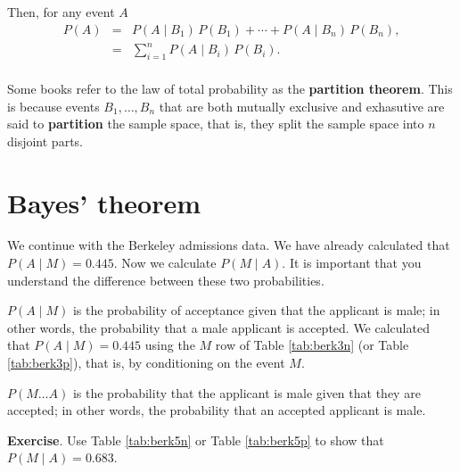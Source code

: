 \documentclass[
  11pt,
  british,
  openany, a4paper]{book}
\begin{document}
Then, for any event \(A\)
\begin{eqnarray}
P(A) &=& P(A \mid B_1)\,P(B_1) + \cdots + P(A \mid B_n)\,P(B_n), \\
     &=& \displaystyle\sum_{i=1}^n P(A \mid B_i)\,P(B_i). \\
\end{eqnarray}

Some books refer to the law of total probability as the \textbf{partition theorem}. This is because events \(B_1, \ldots, B_n\) that are both mutually exclusive and exhasutive are said to \textbf{partition} the sample space, that is, they split the sample space into \(n\) disjoint parts.

\hypertarget{bayes-theorem}{%
\section{Bayes' theorem}\label{bayes-theorem}}

We continue with the Berkeley admissions data. We have already calculated that \(P(A \mid M) = 0.445\). Now we calculate \(P(M \mid A)\). It is important that you understand the difference between these two probabilities.

\(P(A \mid M)\) is the probability of acceptance given that the applicant is male; in other words, the probability that a male applicant is accepted. We calculated that \(P(A \mid M)=0.445\) using the \(M\) row of Table \ref{tab:berk3n} (or Table \ref{tab:berk3p}), that is, by conditioning on the event \(M\).

\(P(M \ldots A)\) is the probability that the applicant is male given that they are accepted; in other words, the probability that an accepted applicant is male.

\textbf{Exercise}. Use Table \ref{tab:berk5n} or Table \ref{tab:berk5p} to show that \(P(M \mid A) = 0.683\).

 
  \providecommand{\huxb}[2]{\arrayrulecolor[RGB]{#1}\global\arrayrulewidth=#2pt}
  \providecommand{\huxvb}[2]{\color[RGB]{#1}\vrule width #2pt}
  \providecommand{\huxtpad}[1]{\rule{0pt}{#1}}
  \providecommand{\huxbpad}[1]{\rule[-#1]{0pt}{#1}}
\end{document}
